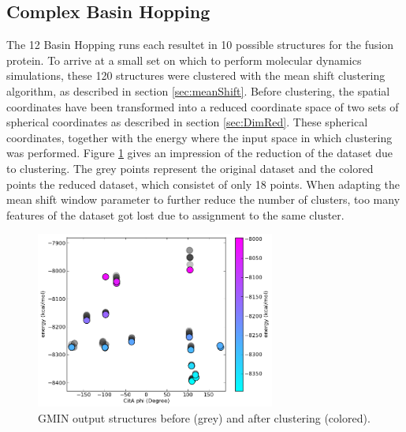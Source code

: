 \documentclass[english, a4paper, 12pt, titlepage, draft]{article}
\begin{document}
\subsection{Complex Basin Hopping}

The 12 Basin Hopping runs each resultet in 10 possible structures for the fusion protein.
To arrive at a small set on which to perform molecular dynamics simulations, these 120 structures were clustered with the mean shift clustering algorithm, as described in section \ref{sec:meanShift}.
Before clustering, the spatial coordinates have been transformed into a reduced coordinate space of two sets of spherical coordinates as described in section \ref{sec:DimRed}.
These spherical coordinates, together with the energy where the input space in which clustering was performed.
Figure \ref{fig:GMIN_CitA_phi} gives an impression of the reduction of the dataset due to clustering.
The grey points represent the original dataset and the colored points the reduced dataset, which consistet of only 18 points.
When adapting the mean shift window parameter to further reduce the number of clusters, too many features of the dataset got lost due to assignment to the same cluster.


\begin{figure}
    \centering
    \includegraphics[width=0.7\textwidth]{figures/CitA_phi.png}
    \caption{GMIN output structures before (grey) and after clustering (colored).}
    \label{fig:GMIN_CitA_phi}
\end{figure}        
\end{document}
